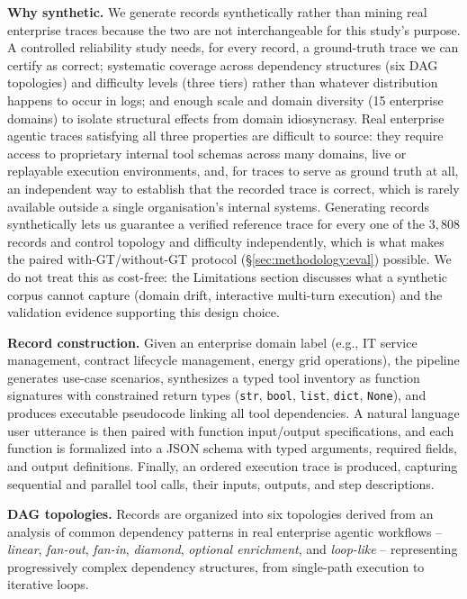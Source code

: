 \noindent\textbf{Why synthetic.} We generate records synthetically rather than mining real enterprise traces because the two are not interchangeable for this study's purpose. A controlled reliability study needs, for every record, a ground-truth trace we can certify as correct; systematic coverage across dependency structures (six DAG topologies) and difficulty levels (three tiers) rather than whatever distribution happens to occur in logs; and enough scale and domain diversity (15 enterprise domains) to isolate structural effects from domain idiosyncrasy. Real enterprise agentic traces satisfying all three properties are difficult to source: they require access to proprietary internal tool schemas across many domains, live or replayable execution environments, and, for traces to serve as ground truth at all, an independent way to establish that the recorded trace is correct, which is rarely available outside a single organisation's internal systems. Generating records synthetically lets us guarantee a verified reference trace for every one of the $3{,}808$ records and control topology and difficulty independently, which is what makes the paired with-GT/without-GT protocol (\S\ref{sec:methodology:eval}) possible. We do not treat this as cost-free: the Limitations section discusses what a synthetic corpus cannot capture (domain drift, interactive multi-turn execution) and the validation evidence supporting this design choice.

\noindent\textbf{Record construction.} Given an enterprise domain label (e.g., IT service management, contract lifecycle management, energy grid operations), the pipeline generates use-case scenarios, synthesizes a typed tool inventory as function signatures with constrained return types (\texttt{str}, \texttt{bool}, \texttt{list}, \texttt{dict}, \texttt{None}), and produces executable pseudocode linking all tool dependencies. A natural language user utterance is then paired with function input/output specifications, and each function is formalized into a JSON schema with typed arguments, required fields, and output definitions. Finally, an ordered execution trace is produced, capturing sequential and parallel tool calls, their inputs, outputs, and step descriptions.

\noindent\textbf{DAG topologies.} Records are organized into six topologies derived from an analysis of common dependency patterns in real enterprise agentic workflows -- \textit{linear}, \textit{fan-out}, \textit{fan-in}, \textit{diamond}, \textit{optional enrichment}, and \textit{loop-like} -- representing progressively complex dependency structures, from single-path execution to iterative loops.

